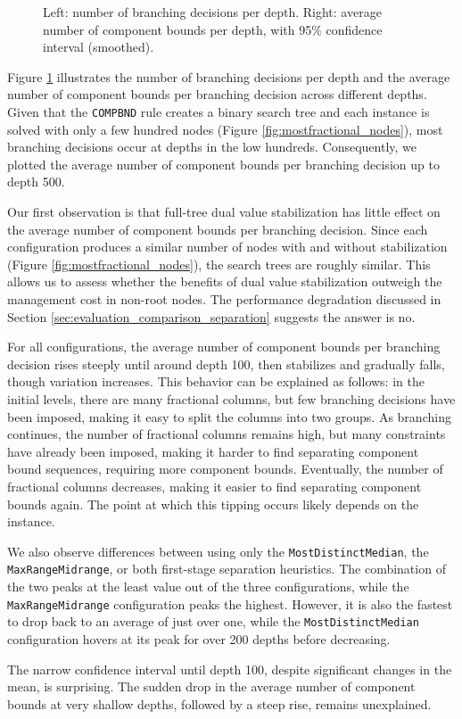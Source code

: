 \begin{figure}
	\caption{Left: number of branching decisions per depth. Right: average number of component bounds per depth, with 95\% confidence interval (smoothed).}
	\label{fig:comparison_depth}
\end{figure}

Figure \ref{fig:comparison_depth} illustrates the number of branching decisions per depth and the average number of component bounds per branching decision across different depths. Given that the \texttt{COMPBND} rule creates a binary search tree and each instance is solved with only a few hundred nodes (Figure \ref{fig:mostfractional_nodes}), most branching decisions occur at depths in the low hundreds. Consequently, we plotted the average number of component bounds per branching decision up to depth 500.

Our first observation is that full-tree dual value stabilization has little effect on the average number of component bounds per branching decision. Since each configuration produces a similar number of nodes with and without stabilization (Figure \ref{fig:mostfractional_nodes}), the search trees are roughly similar. This allows us to assess whether the benefits of dual value stabilization outweigh the management cost in non-root nodes. The performance degradation discussed in Section \ref{sec:evaluation_comparison_separation} suggests the answer is no.

For all configurations, the average number of component bounds per branching decision rises steeply until around depth 100, then stabilizes and gradually falls, though variation increases. This behavior can be explained as follows: in the initial levels, there are many fractional columns, but few branching decisions have been imposed, making it easy to split the columns into two groups. As branching continues, the number of fractional columns remains high, but many constraints have already been imposed, making it harder to find separating component bound sequences, requiring more component bounds. Eventually, the number of fractional columns decreases, making it easier to find separating component bounds again. The point at which this tipping occurs likely depends on the instance.

We also observe differences between using only the \texttt{MostDistinctMedian}, the \texttt{MaxRangeMidrange}, or both first-stage separation heuristics. The combination of the two peaks at the least value out of the three configurations, while the \texttt{MaxRangeMidrange} configuration peaks the highest. However, it is also the fastest to drop back to an average of just over one, while the \texttt{MostDistinctMedian} configuration hovers at its peak for over 200 depths before decreasing.

The narrow confidence interval until depth 100, despite significant changes in the mean, is surprising. The sudden drop in the average number of component bounds at very shallow depths, followed by a steep rise, remains unexplained.
